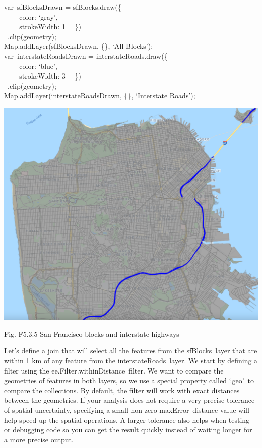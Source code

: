 \documentclass[
  letterpaper,
  DIV=11,
  numbers=noendperiod]{scrreprt}
\begin{document}
var~sfBlocksDrawn = sfBlocks.draw(\{\\
\hspace*{0.333em} ~ ~ ~color: `gray',\\
\hspace*{0.333em} ~ ~ ~strokeWidth: 1~ ~\})\\
\hspace*{0.333em} ~.clip(geometry);\\
Map.addLayer(sfBlocksDrawn, \{\}, `All Blocks');\\
var~interstateRoadsDrawn = interstateRoads.draw(\{\\
\hspace*{0.333em} ~ ~ ~color: `blue',\\
\hspace*{0.333em} ~ ~ ~strokeWidth: 3~ ~\})\\
\hspace*{0.333em} ~.clip(geometry);\\
Map.addLayer(interstateRoadsDrawn, \{\}, `Interstate Roads');

\includegraphics{./F5/image2.png}

Fig. F5.3.5 San Francisco blocks and interstate highways

Let's define a join that will select all the features from the
sfBlocks~layer that are within 1 km of any feature from the
interstateRoads~layer. We start by defining a filter using the
ee.Filter.withinDistance~filter. We want to compare the geometries of
features in both layers, so we use a special property called `.geo'~to
compare the collections. By default, the filter will work with exact
distances between the geometries. If your analysis does not require a
very precise tolerance of spatial uncertainty, specifying a small
non-zero maxError~distance value will help speed up the spatial
operations. A larger tolerance also helps when testing or debugging code
so you can get the result quickly instead of waiting longer for a more
precise output.
\end{document}
